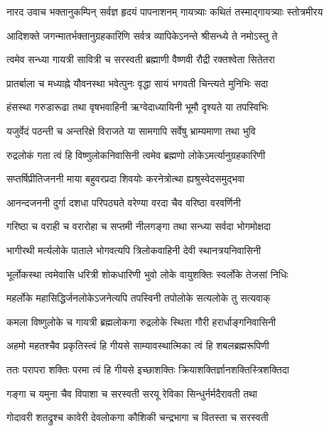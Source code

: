 
नारद उवाच
\twolineshloka
{भक्तानुकम्पिन् सर्वज्ञ हृदयं पापनाशनम्}
{गायत्र्याः कथितं तस्माद्गायत्र्याः स्तोत्रमीरय}

\twolineshloka
{आदिशक्ते जगन्मातर्भक्तानुग्रहकारिणि}
{सर्वत्र व्यापिकेऽनन्ते श्रीसन्ध्ये ते नमोऽस्तु ते}

\twolineshloka
{त्वमेव सन्ध्या गायत्री सावित्री च सरस्वती}
{ब्रह्माणी वैष्णवी रौद्री रक्तश्वेता सितेतरा}

\twolineshloka
{प्रातर्बाला च मध्याह्ने यौवनस्था भवेत्पुनः}
{वृद्धा सायं भगवती चिन्त्यते मुनिभिः सदा}

\twolineshloka
{हंसस्था गरुडारूढा तथा वृषभवाहिनी}
{ऋग्वेदाध्यायिनी भूमौ दृश्यते या तपस्विभिः}

\twolineshloka
{यजुर्वेदं पठन्ती च अन्तरिक्षे विराजते}
{या सामगापि सर्वेषु भ्राम्यमाणा तथा भुवि}

\twolineshloka
{रुद्रलोकं गता त्वं हि विष्णुलोकनिवासिनी}
{त्वमेव ब्रह्मणो लोकेऽमर्त्यानुग्रहकारिणी}

\twolineshloka
{सप्तर्षिप्रीतिजननी माया बहुवरप्रदा}
{शिवयोः करनेत्रोत्था ह्यश्रुस्वेदसमुद्भवा}

\twolineshloka
{आनन्दजननी दुर्गा दशधा परिपठ्यते}
{वरेण्या वरदा चैव वरिष्ठा वरवर्णिनी}

\twolineshloka
{गरिष्ठा च वराही च वरारोहा च सप्तमी}
{नीलगङ्गा तथा सन्ध्या सर्वदा भोगमोक्षदा}

\twolineshloka
{भागीरथी मर्त्यलोके पाताले भोगवत्यपि}
{त्रिलोकवाहिनी देवी स्थानत्रयनिवासिनी}

\twolineshloka
{भूर्लोकस्था त्वमेवासि धरित्री शोकधारिणी}
{भुवो लोके वायुशक्तिः स्वर्लोके तेजसां निधिः}

\twolineshloka
{महर्लोके महासिद्धिर्जनलोकेऽजनेत्यपि}
{तपस्विनी तपोलोके सत्यलोके तु सत्यवाक्}

\twolineshloka
{कमला विष्णुलोके च गायत्री ब्रह्मलोकगा}
{रुद्रलोके स्थिता गौरी हरार्धाङ्गनिवासिनी}

\twolineshloka
{अहमो महतश्चैव प्रकृतिस्त्वं हि गीयसे}
{साम्यावस्थात्मिका त्वं हि शबलब्रह्मरूपिणी}

\twolineshloka
{ततः परापरा शक्तिः परमा त्वं हि गीयसे}
{इच्छाशक्तिः क्रियाशक्तिर्ज्ञानशक्तिस्त्रिशक्तिदा}

\twolineshloka
{गङ्गा च यमुना चैव विपाशा च सरस्वती}
{सरयू रेविका सिन्धुर्नर्मदैरावती तथा}

\twolineshloka
{गोदावरी शतद्रुश्च कावेरी देवलोकगा}
{कौशिकी चन्द्रभागा च वितस्ता च सरस्वती}

